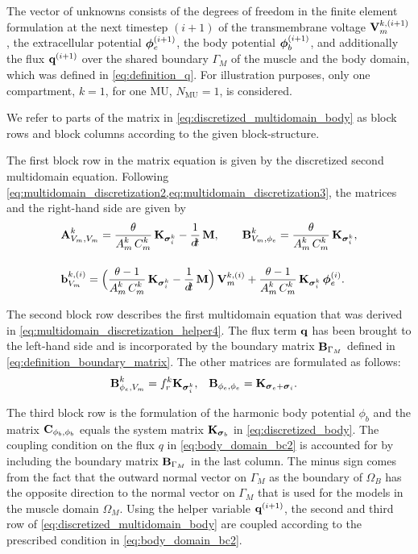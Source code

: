 The vector of unknowns consists of the degrees of freedom in the finite element formulation at the next timestep $(i+1)$ of the transmembrane voltage $\textbf{V}_m^{k,(i+1)}$, the extracellular potential $\boldsymbol{\phi}_{e}^{(i+1)}$, the body potential $\boldsymbol{\phi}_{b}^{(i+1)}$, and additionally the flux $\textbf{q}^{(i+1)}$ over the shared boundary $\Gamma_M$ of the muscle and the body domain, which was defined in \cref{eq:definition_q}. For illustration purposes, only one compartment, $k=1$, for one MU, $N_\text{MU}=1$, is considered.

We refer to parts of the matrix in \cref{eq:discretized_multidomain_body} as block rows and block columns according to the given block-structure.

The first block row in the matrix equation is given by the discretized second multidomain equation. Following \cref{eq:multidomain_discretization2,eq:multidomain_discretization3}, the matrices and the right-hand side are given by
\begin{align*}
  &\bfA^k_{V_m,V_m} = \dfrac{\theta}{A_m^k\,C_m^k}\bfK_{\bfsigma_i^k} -\dfrac{1}{\dt}\bfM, \qquad
  \bfB^k_{V_m,\phi_e} = \dfrac{\theta}{A_m^k\,C_m^k}\bfK_{\bfsigma_i^k},\\[4mm]
  &\bfb_{V_m}^{k,(i)} = \Big( \dfrac{\theta-1}{A_m^k\,C_m^k}\bfK_{\bfsigma_i^k} - \dfrac{1}{\dt}\bfM\Big)\,\bfV_m^{k,(i)} 
      + \dfrac{\theta - 1}{A_m^k\,C_m^k}\bfK_{\bfsigma_i^k}\,\bfphi_e^{(i)}.
\end{align*}
%

The second block row describes the first multidomain equation that was derived in \cref{eq:multidomain_discretization_helper4}. The flux term $\textbf{q}$ has been brought to the left-hand side and is incorporated by the boundary matrix $\textbf{B}_{\Gamma_M}$ defined in \cref{eq:definition_boundary_matrix}. The other matrices are formulated as follows:
%
\begin{align*}
  \textbf{B}_{\phi_e,V_m}^k &= f_r^k \textbf{K}_{\boldsymbol{\sigma}_i^k}, & 
  \textbf{B}_{\phi_e,\phi_e} &= \textbf{K}_{\boldsymbol{\sigma}_e + \boldsymbol{\sigma}_i}.
\end{align*}
%

The third block row is the formulation of the harmonic body potential $\phi_b$ and the matrix $\textbf{C}_{\phi_b,\phi_b}$ equals the system matrix $\textbf{K}_{\boldsymbol{\sigma}_b}$ in \cref{eq:discretized_body}. The coupling condition on the flux $q$ in  \cref{eq:body_domain_bc2} is accounted for by including the boundary matrix $\textbf{B}_{\Gamma_M}$ in the last column. The minus sign comes from the fact that the outward normal vector on $\Gamma_M$ as the boundary of $\Omega_B$ has the opposite direction to the normal vector on $\Gamma_M$ that is used for the models in the muscle domain $\Omega_M$. Using the helper variable $\textbf{q}^{(i+1)}$, the second and third row of \cref{eq:discretized_multidomain_body} are coupled according to the prescribed condition in \cref{eq:body_domain_bc2}.

